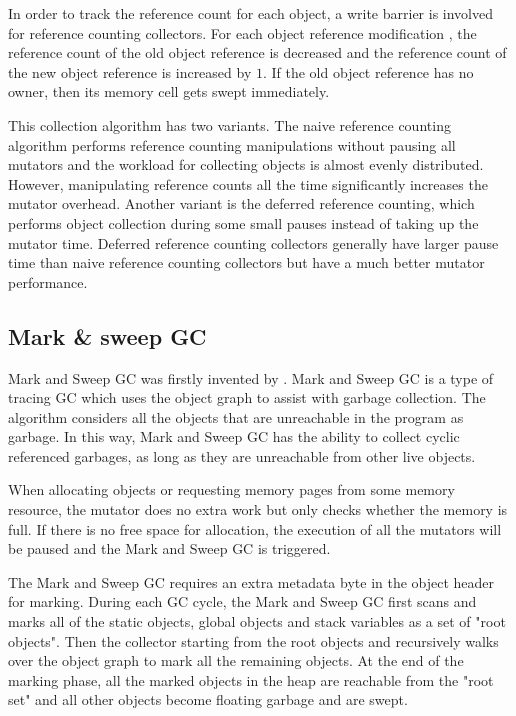 In order to track the reference count for each object, a write barrier is involved
for reference counting collectors.
For each object reference modification , the reference count of
the old object reference is decreased and the reference count of the new object reference
is increased by $1$. If the old object reference has no owner, then its memory cell gets swept immediately.

This collection algorithm has two variants. The naive reference counting algorithm
performs reference counting manipulations without pausing all mutators and the workload for collecting objects is
almost evenly distributed. However, manipulating reference counts all the time significantly increases the
mutator overhead. Another variant is the deferred reference counting, which performs object collection during some small pauses instead of taking up
the mutator time.
Deferred reference counting collectors generally have larger pause time than naive reference counting collectors
but have a much better mutator performance.


\subsection{Mark \& sweep GC}

Mark and Sweep GC was firstly invented by \cite{mccarthy1960recursive}.
Mark and Sweep GC is a type of tracing GC which uses the object graph to assist with garbage collection.
The algorithm considers all the objects that are unreachable in the program as garbage.
In this way, Mark and Sweep GC has the ability to collect cyclic referenced garbages,
as long as they are unreachable from other live objects.


When allocating objects or requesting memory pages from some memory resource,
the mutator does no extra work but only checks whether the memory is full.
If there is no free space for allocation, the execution of all the mutators will be
paused and the Mark and Sweep GC is triggered.

The Mark and Sweep GC requires an extra metadata byte in the object header for marking.
During each GC cycle, the Mark and Sweep GC first scans and marks all of the static objects,
global objects and stack variables as a set of "root objects".
Then the collector starting from the root objects and recursively walks over the
object graph to mark all the remaining objects. At the end of the marking phase,
all the marked objects in the heap are reachable from the "root set" and all other
objects become floating garbage and are swept.

